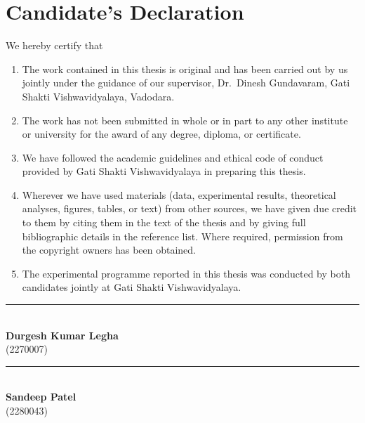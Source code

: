 \chapter*{Candidate's Declaration}
\thispagestyle{plain}

We hereby certify that
\begin{enumerate}[label=(\roman*)]
    \item The work contained in this thesis is original and has been carried
          out by us jointly under the guidance of our supervisor,
          Dr.\ Dinesh Gundavaram, Gati Shakti Vishwavidyalaya, Vadodara.
    \item The work has not been submitted in whole or in part to any other
          institute or university for the award of any degree, diploma, or
          certificate.
    \item We have followed the academic guidelines and ethical code of
          conduct provided by Gati Shakti Vishwavidyalaya in preparing this
          thesis.
    \item Wherever we have used materials (data, experimental results,
          theoretical analyses, figures, tables, or text) from other sources,
          we have given due credit to them by citing them in the text of the
          thesis and by giving full bibliographic details in the reference
          list. Where required, permission from the copyright owners has been
          obtained.
    \item The experimental programme reported in this thesis was conducted by
          both candidates jointly at Gati Shakti Vishwavidyalaya.
\end{enumerate}

\vspace{2cm}

\noindent\begin{minipage}[t]{0.45\textwidth}
\centering
\rule{6cm}{0.4pt}\\[2pt]
\textbf{Durgesh Kumar Legha}\\
(2270007)
\end{minipage}\hfill
\begin{minipage}[t]{0.45\textwidth}
\centering
\rule{6cm}{0.4pt}\\[2pt]
\textbf{Sandeep Patel}\\
(2280043)
\end{minipage}

